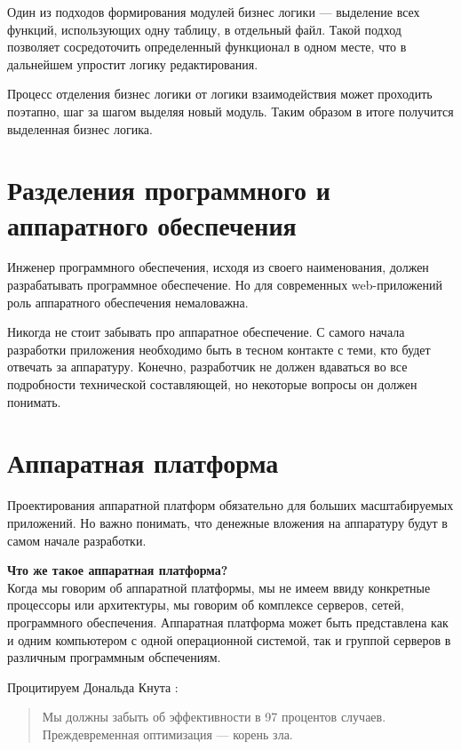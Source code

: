 Один из подходов формирования модулей бизнес логики --- выделение всех функций, использующих одну таблицу, в отдельный файл. Такой подход позволяет сосредоточить определенный функционал в одном месте, что в дальнейшем упростит логику редактирования.

Процесс отделения бизнес логики от логики взаимодействия может проходить поэтапно, шаг за шагом выделяя новый модуль. Таким образом в итоге получится выделенная бизнес логика.


\section{ Разделения программного и аппаратного обеспечения } \label{sect2_5}

Инженер программного обеспечения, исходя из своего наименования, должен разрабатывать программное обеспечение. Но для современных web-приложений роль аппаратного обеспечения немаловажна.

Никогда не стоит забывать про аппаратное обеспечение. С самого начала разработки приложения необходимо быть в тесном контакте с теми, кто будет отвечать за аппаратуру. Конечно, разработчик не должен вдаваться во все подробности технической составляющей, но некоторые вопросы он должен понимать.


\section{ Аппаратная платформа } \label{sect2_6}

Проектирования аппаратной платформ обязательно для больших масштабируемых приложений. Но важно понимать, что денежные вложения на аппаратуру будут в самом начале разработки. 

\begin{center}
\begin{minipage}
{0.8\textwidth} 
\textbf{Что же такое аппаратная платформа?}\\
Когда мы говорим об аппаратной платформы, мы не имеем ввиду конкретные процессоры или архитектуры, мы говорим об комплексе серверов, сетей,  программного обеспечения. Аппаратная платформа может быть представлена как и одним компьютером с одной операционной системой, так и группой серверов в различным программным обспечениям.
\end{minipage}
\end{center}

Процитируем Дональда Кнута : 
\begin{flushleft}
\begin{verse}
Мы должны забыть об эффективности в 97 процентов случаев. Преждевременная оптимизация --- корень зла.
\end{verse}
\end{flushleft}


